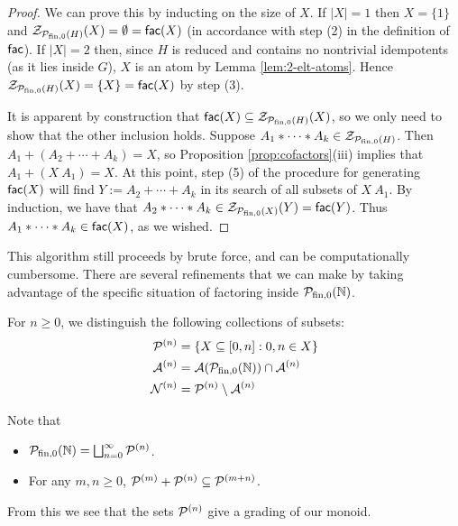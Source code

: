 \begin{proof}
We can prove this by inducting on the size of $X$.
If $|X|=1$ then $X = \{1\}$ and $\Z_{\P_\fon(H)}(X) = \emptyset = \alg{fac}(X)$ (in accordance with step (2) in the definition of $\alg{fac}$).
If $|X| = 2$ then, since $H$ is reduced and contains no nontrivial idempotents (as it lies inside $G$), $X$ is an atom by Lemma \ref{lem:2-elt-atoms}.
Hence $\Z_{\P_\fon(H)}(X) = \{X\} = \alg{fac}(X)$ by step (3).
	
It is apparent by construction that $\alg{fac}(X) \subseteq \Z_{\P_\fon(H)}(X)$, so we only need to show that the other inclusion holds.
Suppose $A_1*\cdots*A_k \in \Z_{\P_\fon(H)}$.
Then $A_1 + (A_2 + \cdots + A_k) = X$, so Proposition \ref{prop:cofactors}(iii) implies that $A_1 + (X\:A_1) = X$.
At this point, step (5) of the procedure for generating $\alg{fac}(X)$ will find $Y:=A_2+\cdots+A_k$ in its search of all subsets of $X\:A_1$.
By induction, we have that $A_2*\cdots*A_k \in \Z_{\P_\fon(X)}(Y) = \alg{fac}(Y)$.
Thus $A_1 * \cdots * A_k \in \alg{fac}(X)$, as we wished.
\end{proof}

This algorithm still proceeds by brute force, and can be computationally cumbersome.  
There are several refinements that we can make by taking advantage of the specific situation of factoring inside $\PN$.

\begin{defn} \label{def:filtration}
	For $n\ge 0$, we distinguish the following collections of subsets:
	\begin{align*}
	\P^{(n)} &= \{ X \subseteq [ 0,n ] : 0,n\in X \} \\
	\mathcal{A}^{(n)} &= \mathcal{A}(\PN) \cap \A^{(n)}  \\
	\mathcal{N}^{(n)} &= \P^{(n)} \setminus \mathcal{A}^{(n)} 
	\end{align*}
\end{defn}

\begin{rk}
Note that 
\begin{itemize}
	\item $\PN = \bigsqcup_{n=0}^\infty \P^{(n)}$.
	\item For any $m,n\ge 0$, $\P^{(m)} + \P^{(n)} \subseteq \P^{(m+n)}$.
\end{itemize}
From this we see that the sets $\P^{(n)}$ give a grading of our monoid.
\end{rk}

